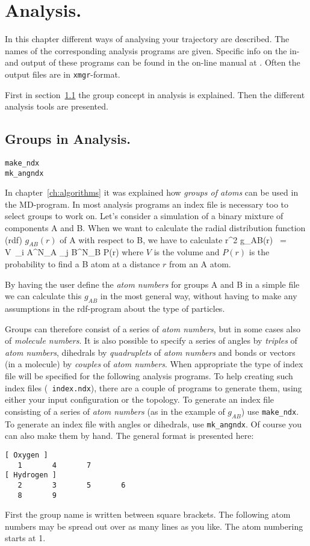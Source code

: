 \chapter{Analysis.}
\label{ch:analysis}
In this chapter different ways of analysing your trajectory are described. 
The names of the corresponding analysis programs are given. 
Specific info on the in- and output of these programs can be found 
in the on-line manual at {\wwwpage}.
Often the output files are in {\tt xmgr}-format.

First in section~\ref{sec:groups} the group concept in analysis is explained. 
Then the different analysis tools are presented.
%
%
\section{Groups in Analysis.}
\label{sec:groups}
\begin{verbatim}
make_ndx
mk_angndx
\end{verbatim}
In chapter~\ref{ch:algorithms} it was explained how {\em groups of atoms} can 
be used in the MD-program. 
In most analysis programs an index file is necessary too to select groups to
work on. Let's consider a simulation of a binary mixture of components A and
B. When we want to calculate the radial distribution function (rdf) 
$g_{AB}(r)$ of A with respect to B, we have to calculate
\pi r^2 g_{AB}(r)	~=~	V~\sum_{i \in A}^{N_A} \sum_{j \in B}^{N_B} P(r)
\eeq
where $V$ is the volume and $P(r)$ is the probability to find a B atom
at a distance $r$ from an A atom.

By having the user define the {\em atom numbers} for groups A and B in
a simple file we can calculate this $g_{AB}$ in the most general way, without
having to make any assumptions in the rdf-program about the type of 
particles. 

Groups can therefore consist of a series of {\em atom numbers}, but in
some cases also of {\em molecule numbers}.  It is also possible to
specify a series of angles by {\em triples} of {\em atom numbers},
dihedrals by {\em quadruplets} of {\em atom numbers} and bonds or
vectors (in a molecule) by {\em couples} of {\em atom numbers}. When
appropriate the type of index file will be specified for the following
analysis programs.  To help creating such index files ({\tt
index.ndx}), there are a couple of programs to generate them, using
either your input configuration or the topology.  To generate an
index file consisting of a series of {\em atom numbers} (as in the
example of $g_{AB}$) use {\tt make\_ndx}. To generate an index file
with angles or dihedrals, use {\tt mk\_angndx}. Of course you can also
make them by hand. The general format is presented here:
{\samepage
\begin{verbatim}
[ Oxygen ]
   1       4       7 
[ Hydrogen ]
   2       3       5       6
   8       9
\end{verbatim}
}
First the group name is written between square brackets.
The following atom numbers may be spread out over as many lines as you like.
The atom numbering starts at 1. 
%
%
